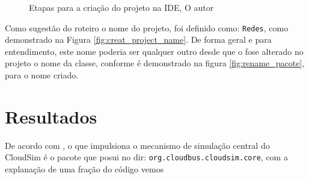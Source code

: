 \begin{figure}[H]
    \center
    \caption{Etapas para a criação do projeto na IDE, O autor}\label{fig:confi_project}
\end{figure}
\par Como sugestão do roteiro o nome do projeto, foi definido como: \verb#Redes#, como demonstrado na Figura \ref{fig:creat_project_name}. De forma geral e para entendimento, este nome poderia ser qualquer outro desde que o fose alterado no projeto o nome da classe, conforme é demonstrado na figura \ref{fig:rename_pacote}, para o nome criado.



\section{Resultados}
\par De acordo com , o que impulsiona o mecanismo de simulação central do CloudSim é o pacote que posui no dir: \verb#org.cloudbus.cloudsim.core#, com a explanação de uma fração do código vemos


